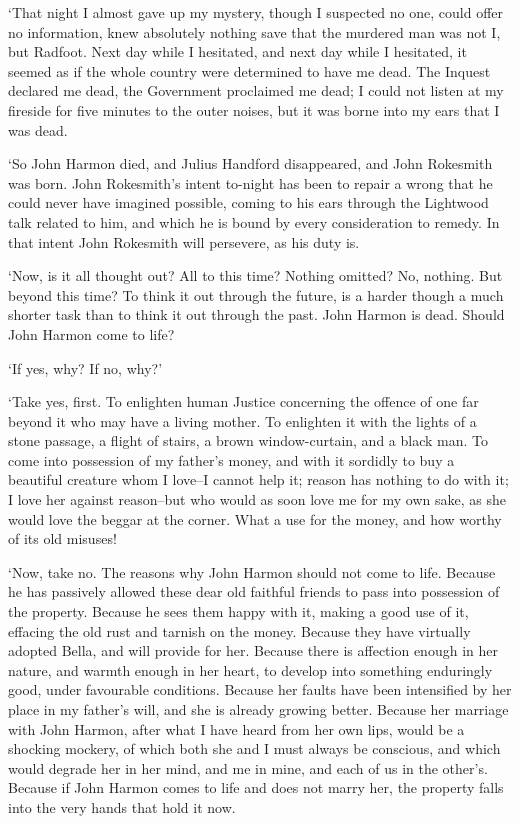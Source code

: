 ‘That night I almost gave up my mystery, though I suspected no one,
could offer no information, knew absolutely nothing save that the
murdered man was not I, but Radfoot. Next day while I hesitated, and
next day while I hesitated, it seemed as if the whole country were
determined to have me dead. The Inquest declared me dead, the Government
proclaimed me dead; I could not listen at my fireside for five minutes
to the outer noises, but it was borne into my ears that I was dead.

‘So John Harmon died, and Julius Handford disappeared, and John
Rokesmith was born. John Rokesmith’s intent to-night has been to repair
a wrong that he could never have imagined possible, coming to his ears
through the Lightwood talk related to him, and which he is bound by
every consideration to remedy. In that intent John Rokesmith will
persevere, as his duty is.

‘Now, is it all thought out? All to this time? Nothing omitted? No,
nothing. But beyond this time? To think it out through the future, is a
harder though a much shorter task than to think it out through the past.
John Harmon is dead. Should John Harmon come to life?

‘If yes, why? If no, why?’

‘Take yes, first. To enlighten human Justice concerning the offence of
one far beyond it who may have a living mother. To enlighten it with the
lights of a stone passage, a flight of stairs, a brown window-curtain,
and a black man. To come into possession of my father’s money, and with
it sordidly to buy a beautiful creature whom I love--I cannot help it;
reason has nothing to do with it; I love her against reason--but who
would as soon love me for my own sake, as she would love the beggar at
the corner. What a use for the money, and how worthy of its old misuses!

‘Now, take no. The reasons why John Harmon should not come to life.
Because he has passively allowed these dear old faithful friends to pass
into possession of the property. Because he sees them happy with it,
making a good use of it, effacing the old rust and tarnish on the money.
Because they have virtually adopted Bella, and will provide for her.
Because there is affection enough in her nature, and warmth enough in
her heart, to develop into something enduringly good, under favourable
conditions. Because her faults have been intensified by her place in my
father’s will, and she is already growing better. Because her marriage
with John Harmon, after what I have heard from her own lips, would be a
shocking mockery, of which both she and I must always be conscious, and
which would degrade her in her mind, and me in mine, and each of us in
the other’s. Because if John Harmon comes to life and does not marry
her, the property falls into the very hands that hold it now.

